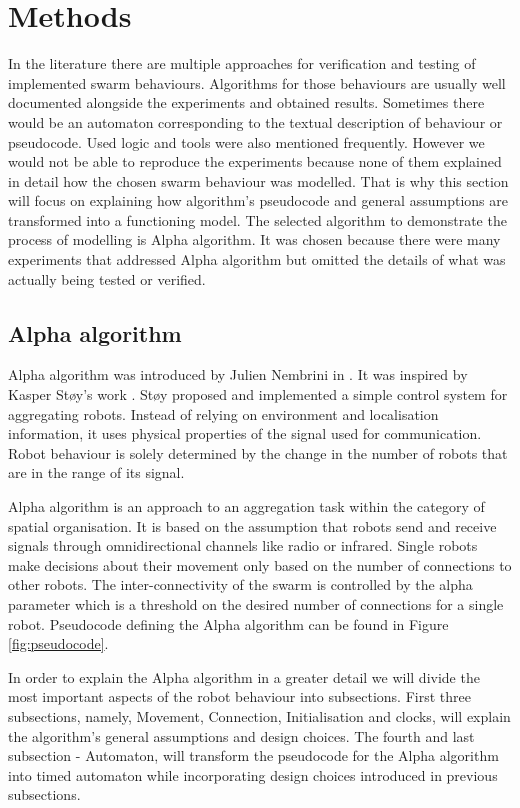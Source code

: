 \section{Methods}
In the literature there are multiple approaches for verification and testing of implemented swarm behaviours. Algorithms for those behaviours are usually well documented alongside the experiments and obtained results. Sometimes there would be an automaton corresponding to the textual description of behaviour or pseudocode. Used logic and tools were also mentioned frequently. However we would not be able to reproduce the experiments because none of them explained in detail how the chosen swarm behaviour was modelled. That is why this section will focus on explaining how algorithm's pseudocode and general assumptions are transformed into a functioning model. The selected algorithm to demonstrate the process of modelling is Alpha algorithm. It was chosen because there were many experiments that addressed Alpha algorithm but omitted the details of what was actually being tested or verified.

\subsection{Alpha algorithm}
Alpha algorithm was introduced by Julien Nembrini in \cite{Minimalist_Coherent_Swarming_of_Wireless_Networked_Autonomous_Mobile_Robots}. It was inspired by Kasper Støy's work \cite{Using_Situated_Communication_in_Distributed_Autonomous_Mobile_Robotics}. Støy proposed and implemented a simple control system for aggregating robots. Instead of relying on environment and localisation information, it uses physical properties of the signal used for communication. Robot behaviour is solely determined by the change in the number of robots that are in the range of its signal.

Alpha algorithm is an approach to an aggregation task within the category of spatial organisation. It is based on the assumption that robots send and receive signals through omnidirectional channels like radio or infrared. Single robots make decisions about their movement only based on the number of connections to other robots. The inter-connectivity of the swarm is controlled by the alpha parameter which is a threshold on the desired number of connections for a single robot. Pseudocode defining the Alpha algorithm can be found in Figure \ref{fig:pseudocode}.

In order to explain the Alpha algorithm in a greater detail we will divide the most important aspects of the robot behaviour into subsections. First three subsections, namely, Movement, Connection, Initialisation and clocks, will explain the algorithm's general assumptions and design choices. The fourth and last subsection - Automaton, will transform the pseudocode for the Alpha algorithm into timed automaton while incorporating design choices introduced in previous subsections.

